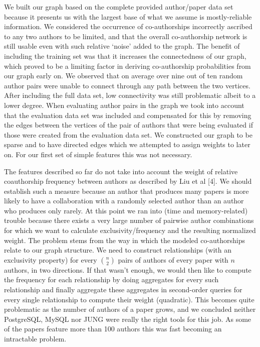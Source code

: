 We built our graph based on the complete provided author/paper data set because it presents us with the largest base of what we assume is mostly-reliable information.
We considered the occurrence of co-authorships incorrectly ascribed to any two authors to be limited, and that the overall co-authorship network is still usable even with such relative `noise' added to the graph.
The benefit of including the training set was that it increases the connectedness of our graph, which proved to be a limiting factor in deriving co-authorship probabilities from our graph early on.
We observed that on average over nine out of ten random author pairs were unable to connect through any path between the two vertices.
After including the full data set, low connectivity was still problematic albeit to a lower degree.
When evaluating author pairs in the graph we took into account that the evaluation data set was included and compensated for this by removing the edges between the vertices of the pair of authors that were being evaluated if those were created from the evaluation data set.
We constructed our graph to be sparse and to have directed edges which we attempted to assign weights to later on.
For our first set of simple features this was not necessary. 

The features described so far do not take into account the weight of relative coauthorship frequency between authors as described by Liu et al [4].
We should establish such a measure because an author that produces many papers is more likely to have a collaboration with a randomly selected author than an author who produces only rarely.
At this point we ran into (time and memory-related) trouble because there exists a very large number of pairwise author combinations for which we want to calculate exclusivity/frequency and the resulting normalized weight.
The problem stems from the way in which the modeled co-authorships relate to our graph structure.
We need to construct relationships (with an exclusivity property) for every $n \choose 2$ pairs of authors of every paper with $n$ authors, in two directions.
If that wasn't enough, we would then like to compute the frequency for each relationship by doing aggregates for every such relationship and finally aggregate these aggregates in second-order queries for every single relationship to compute their weight (quadratic).
This becomes quite problematic as the number of authors of a paper grows, and we concluded neither PostgreSQL, MySQL nor JUNG were really the right tools for this job.
As some of the papers feature more than 100 authors this was fast becoming an intractable problem.

